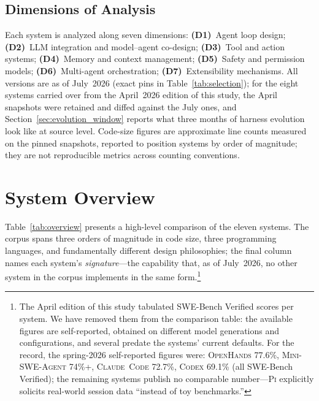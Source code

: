 \documentclass[11pt,a4paper]{article}
\newcommand{\clcode}{\textsc{Claude~Code}\xspace}
\newcommand{\cdx}{\textsc{Codex}\xspace}
\newcommand{\oh}{\textsc{OpenHands}\xspace}
\newcommand{\mswe}{\textsc{Mini-SWE-Agent}\xspace}
\newcommand{\pib}{\textsc{Pi}\xspace}
\begin{document}
\subsection{Dimensions of Analysis}

Each system is analyzed along seven dimensions:
\textbf{(D1)}~Agent loop design;
\textbf{(D2)}~LLM integration and model--agent co-design;
\textbf{(D3)}~Tool and action systems;
\textbf{(D4)}~Memory and context management;
\textbf{(D5)}~Safety and permission models;
\textbf{(D6)}~Multi-agent orchestration;
\textbf{(D7)}~Extensibility mechanisms.
All versions are as of July~2026 (exact pins in Table~\ref{tab:selection}); for the eight systems carried over from the April~2026 edition of this study, the April snapshots were retained and diffed against the July ones, and Section~\ref{sec:evolution_window} reports what three months of harness evolution look like at source level.
Code-size figures are approximate line counts measured on the pinned snapshots, reported to position systems by order of magnitude; they are not reproducible metrics across counting conventions.

\section{System Overview}
\label{sec:overview}

Table~\ref{tab:overview} presents a high-level comparison of the eleven systems.
The corpus spans three orders of magnitude in code size, three programming languages, and fundamentally different design philosophies; the final column names each system's \emph{signature}---the capability that, as of July~2026, no other system in the corpus implements in the same form.\footnote{The April edition of this study tabulated SWE-Bench Verified scores per system. We have removed them from the comparison table: the available figures are self-reported, obtained on different model generations and configurations, and several predate the systems' current defaults. For the record, the spring-2026 self-reported figures were: \oh{} 77.6\%, \mswe{} 74\%+, \clcode{} 72.7\%, \cdx{} 69.1\% (all SWE-Bench Verified); the remaining systems publish no comparable number---\pib{} explicitly solicits real-world session data ``instead of toy benchmarks.''}
\end{document}
